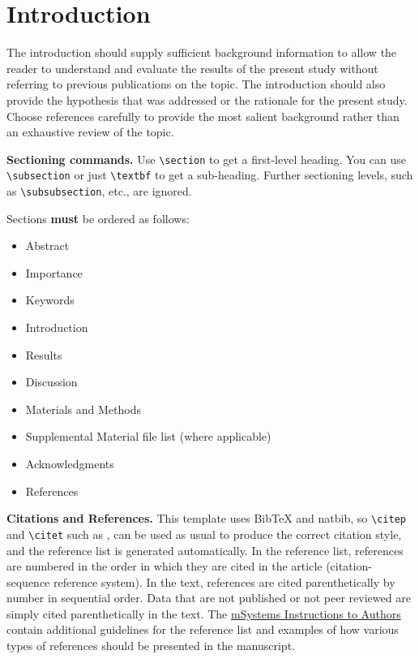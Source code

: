 \documentclass[lineno]{asm-article}
\begin{document}
\section{Introduction}

The introduction should supply sufficient background information to allow the reader to understand and evaluate the results of the present study without referring to previous publications on the topic. The introduction should also provide the hypothesis that was addressed or the rationale for the present study. Choose references carefully to provide the most salient background rather than an exhaustive review of the topic.

\textbf{Sectioning commands.}
Use \verb|\section| to get a first-level heading. You can use \verb|\subsection| or just \verb|\textbf| to get a sub-heading. Further sectioning levels, such as \verb|\subsubsection|, etc., are ignored.

Sections \textbf{must} be ordered as follows:

\begin{itemize}
\item Abstract
\item Importance
\item Keywords
\item Introduction
\item Results
\item Discussion
\item Materials and Methods
\item Supplemental Material file list (where applicable)
\item Acknowledgments
\item References
\end{itemize}

\textbf{Citations and References.}
This template uses BibTeX and natbib, so \verb|\citep| and \verb|\citet| such as \citep{caserta:etal:2012}, \citet{johnson:robinson:2016} can be used as usual to produce the correct citation style, and the reference list is generated automatically. In the reference list, references are numbered in the order in which they are cited in the article (citation-sequence reference system). In the text, references are cited parenthetically by number in sequential order. Data that are not published or not peer reviewed are simply cited parenthetically in the text. The \href{https://journals.asm.org/journal/msystems/article-types}{mSystems Instructions to Authors} contain additional guidelines for the reference list and examples of how various types of references should be presented in the manuscript.
\end{document}
